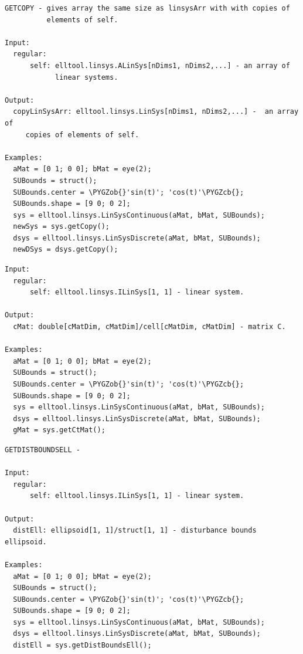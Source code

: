 \documentclass[letterpaper,10pt,english]{sphinxmanual}
\def\PYGZob{\char`\{}
\def\PYGZcb{\char`\}}
\begin{document}
\label{chap_func:elltool-linsys-alinsys-getcopy}
\begin{Verbatim}[commandchars=\\\{\}]
GETCOPY - gives array the same size as linsysArr with with copies of
          elements of self.

Input:
  regular:
      self: elltool.linsys.ALinSys[nDims1, nDims2,...] - an array of
            linear systems.

Output:
  copyLinSysArr: elltool.linsys.LinSys[nDims1, nDims2,...] -  an array of
     copies of elements of self.

Examples:
  aMat = [0 1; 0 0]; bMat = eye(2);
  SUBounds = struct();
  SUBounds.center = \PYGZob{}'sin(t)'; 'cos(t)'\PYGZcb{};
  SUBounds.shape = [9 0; 0 2];
  sys = elltool.linsys.LinSysContinuous(aMat, bMat, SUBounds);
  newSys = sys.getCopy();
  dsys = elltool.linsys.LinSysDiscrete(aMat, bMat, SUBounds);
  newDSys = dsys.getCopy();
\end{Verbatim}
\label{chap_func:elltool-linsys-alinsys-getctmat}
\begin{Verbatim}[commandchars=\\\{\}]
Input:
  regular:
      self: elltool.linsys.ILinSys[1, 1] - linear system.

Output:
  cMat: double[cMatDim, cMatDim]/cell[cMatDim, cMatDim] - matrix C.

Examples:
  aMat = [0 1; 0 0]; bMat = eye(2);
  SUBounds = struct();
  SUBounds.center = \PYGZob{}'sin(t)'; 'cos(t)'\PYGZcb{};
  SUBounds.shape = [9 0; 0 2];
  sys = elltool.linsys.LinSysContinuous(aMat, bMat, SUBounds);
  dsys = elltool.linsys.LinSysDiscrete(aMat, bMat, SUBounds);
  gMat = sys.getCtMat();
\end{Verbatim}
\label{chap_func:elltool-linsys-alinsys-getdistboundsell}
\begin{Verbatim}[commandchars=\\\{\}]
GETDISTBOUNDSELL -

Input:
  regular:
      self: elltool.linsys.ILinSys[1, 1] - linear system.

Output:
  distEll: ellipsoid[1, 1]/struct[1, 1] - disturbance bounds ellipsoid.

Examples:
  aMat = [0 1; 0 0]; bMat = eye(2);
  SUBounds = struct();
  SUBounds.center = \PYGZob{}'sin(t)'; 'cos(t)'\PYGZcb{};
  SUBounds.shape = [9 0; 0 2];
  sys = elltool.linsys.LinSysContinuous(aMat, bMat, SUBounds);
  dsys = elltool.linsys.LinSysDiscrete(aMat, bMat, SUBounds);
  distEll = sys.getDistBoundsEll();
\end{Verbatim}
\end{document}
